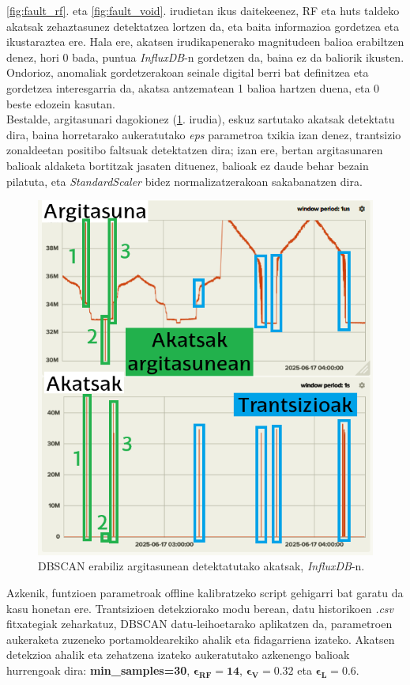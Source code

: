 \documentclass[12pt]{article}
\numberwithin{figure}{section}
\numberwithin{equation}{section}
\begin{document}
\ref{fig:fault_rf}. eta \ref{fig:fault_void}. irudietan ikus daitekeenez, RF eta huts taldeko akatsak zehaztasunez detektatzea lortzen da, eta baita informazioa gordetzea eta ikustaraztea ere. Hala ere, akatsen irudikapenerako magnitudeen balioa erabiltzen denez, hori 0 bada, puntua \textit{InfluxDB}-n gordetzen da, baina ez da baliorik ikusten. Ondorioz, anomaliak gordetzerakoan seinale digital berri bat definitzea eta gordetzea interesgarria da, akatsa antzematean 1 balioa hartzen duena, eta 0 beste edozein kasutan.\\

Bestalde, argitasunari dagokionez (\ref{fig:argitasuna_akatsak}. irudia), eskuz sartutako akatsak detektatu dira, baina horretarako aukeratutako \textit{eps} parametroa txikia izan denez, trantsizio zonaldeetan positibo faltsuak detektatzen dira; izan ere, bertan argitasunaren balioak aldaketa bortitzak jasaten dituenez, balioak ez daude behar bezain pilatuta, eta \textit{StandardScaler} bidez normalizatzerakoan sakabanatzen dira.
\newpage
\begin{figure}[h]
    \centering
    \includegraphics[width=0.6\linewidth]{5 - Zerbitzuaren garapena/fault_dashboard_argitasuna.png}
    \caption{DBSCAN erabiliz argitasunean detektatutako akatsak, \textit{InfluxDB}-n.}
    \label{fig:argitasuna_akatsak}
\end{figure}

Azkenik, funtzioen parametroak offline kalibratzeko script gehigarri bat garatu da kasu honetan ere. Trantsizioen detekziorako modu berean, datu historikoen \textit{.csv} fitxategiak zeharkatuz, DBSCAN datu-leihoetarako aplikatzen da, parametroen aukeraketa zuzeneko portamoldearekiko ahalik eta fidagarriena izateko. Akatsen detekzioa ahalik eta zehatzena izateko aukeratutako azkenengo balioak hurrengoak dira: \textbf{min\_samples=30}, $\mathbf{\epsilon_{RF}=14}$, $\mathbf{\epsilon_{V}=0.32}$ eta $\mathbf{\epsilon_{L}=0.6}$.\\
\end{document}

